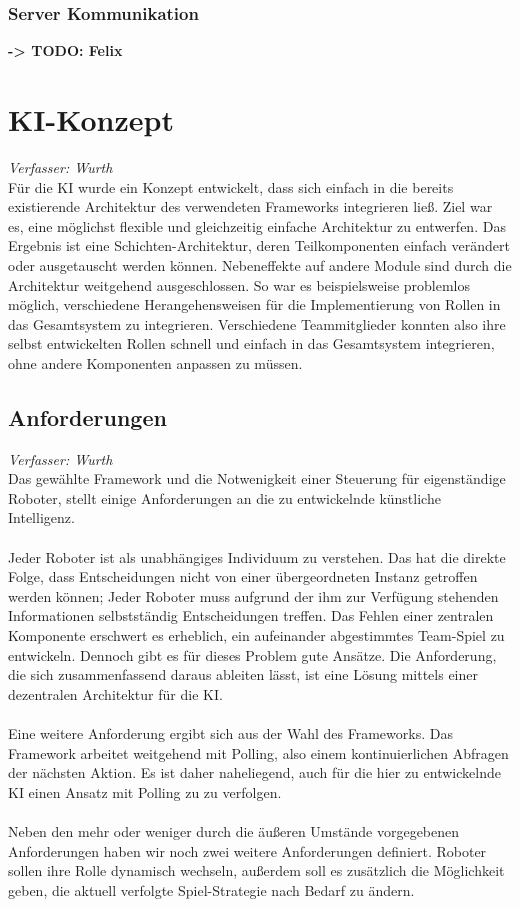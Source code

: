 \documentclass[fontsize=12pt,a4paper,final]{scrartcl}[2003/01/01]
\begin{document}
\subsubsection{Server Kommunikation}
\textbf{-> TODO: Felix}

\section{KI-Konzept}
\textit{Verfasser: Wurth}\\

Für die KI wurde ein Konzept entwickelt, dass sich einfach in die bereits existierende Architektur des verwendeten Frameworks integrieren ließ. Ziel war es, eine möglichst flexible und gleichzeitig einfache Architektur zu entwerfen. Das Ergebnis ist eine Schichten-Architektur, deren Teilkomponenten einfach verändert oder ausgetauscht werden können. Nebeneffekte auf andere Module sind durch die Architektur weitgehend ausgeschlossen. So war es beispielsweise problemlos möglich, verschiedene Herangehensweisen für die Implementierung von Rollen in das Gesamtsystem zu integrieren. Verschiedene Teammitglieder konnten also ihre selbst entwickelten Rollen schnell und einfach in das Gesamtsystem integrieren, ohne andere Komponenten anpassen zu müssen.

\subsection{Anforderungen}
\textit{Verfasser: Wurth}\\

Das gewählte Framework und die Notwenigkeit einer Steuerung für eigenständige Roboter, stellt einige Anforderungen an die zu entwickelnde künstliche Intelligenz.\\
\\
Jeder Roboter ist als unabhängiges Individuum zu verstehen. Das hat die direkte Folge, dass Entscheidungen nicht von einer übergeordneten Instanz getroffen werden können; Jeder Roboter muss aufgrund der ihm zur Verfügung stehenden Informationen selbstständig Entscheidungen treffen. Das Fehlen einer zentralen Komponente erschwert es erheblich, ein aufeinander abgestimmtes Team-Spiel zu entwickeln. Dennoch gibt es für dieses Problem gute Ansätze. Die Anforderung, die sich zusammenfassend daraus ableiten lässt, ist eine Lösung mittels einer dezentralen Architektur für die KI.\\
\\
Eine weitere Anforderung ergibt sich aus der Wahl des Frameworks. Das Framework arbeitet weitgehend mit Polling, also einem kontinuierlichen Abfragen der nächsten Aktion. Es ist daher naheliegend, auch für die hier zu entwickelnde KI einen Ansatz mit Polling zu zu verfolgen.\\
\\
Neben den mehr oder weniger durch die äußeren Umstände vorgegebenen Anforderungen haben wir noch zwei weitere Anforderungen definiert. Roboter sollen ihre Rolle dynamisch wechseln, außerdem soll es zusätzlich die Möglichkeit geben, die aktuell verfolgte Spiel-Strategie nach Bedarf zu ändern.
\end{document}
